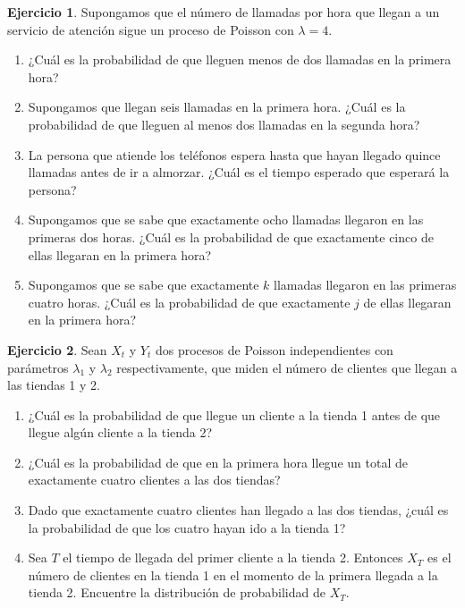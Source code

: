 \documentclass{article}
\theoremstyle{plain}
\theoremstyle{definition}
\newtheorem{Ejercicio}{Ejercicio}[section]
\begin{document}
\begin{Ejercicio}
  Supongamos que el n\'umero de llamadas por hora que llegan a un servicio de atenci\'on sigue un proceso de Poisson con $\lambda = 4$.
  \begin{enumerate}
    \item ¿Cu\'al es la probabilidad de que lleguen menos de dos llamadas en la primera hora?
    \item Supongamos que llegan seis llamadas en la primera hora. ¿Cu\'al es la probabilidad de que lleguen al menos dos llamadas en la segunda hora?
    \item La persona que atiende los tel\'efonos espera hasta que hayan llegado quince llamadas antes de ir a almorzar. ¿Cu\'al es el tiempo esperado que esperar\'a la persona?
    \item Supongamos que se sabe que exactamente ocho llamadas llegaron en las primeras dos horas. ¿Cu\'al es la probabilidad de que exactamente cinco de ellas llegaran en la primera hora?
    \item Supongamos que se sabe que exactamente $k$ llamadas llegaron en las primeras cuatro horas. ¿Cu\'al es la probabilidad de que exactamente $j$ de ellas llegaran en la primera hora?
  \end{enumerate}
\end{Ejercicio}

\begin{Ejercicio}
  Sean $X_t$ y $Y_t$ dos procesos de Poisson independientes con par\'ametros $\lambda_1$ y $\lambda_2$ respectivamente, que miden el n\'umero de clientes que llegan a las tiendas 1 y 2.
  \begin{enumerate}
    \item ¿Cu\'al es la probabilidad de que llegue un cliente a la tienda 1 antes de que llegue alg\'un cliente a la tienda 2?
    \item ¿Cu\'al es la probabilidad de que en la primera hora llegue un total de exactamente cuatro clientes a las dos tiendas?
    \item Dado que exactamente cuatro clientes han llegado a las dos tiendas, ¿cu\'al es la probabilidad de que los cuatro hayan ido a la tienda 1?
    \item Sea $T$ el tiempo de llegada del primer cliente a la tienda 2. Entonces $X_T$ es el n\'umero de clientes en la tienda 1 en el momento de la primera llegada a la tienda 2. Encuentre la distribuci\'on de probabilidad de $X_T$.
  \end{enumerate}
\end{Ejercicio}
\end{document}
